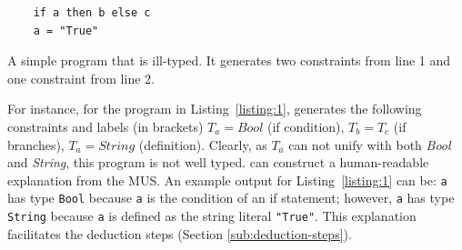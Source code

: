 \begin{listing}[!ht]
\begin{verbatim}
    if a then b else c
    a = "True"
\end{verbatim}
\vspace*{-9mm}
\caption{A simple program that is ill-typed. It generates two constraints from line 1 and one constraint from line 2. }
\label{listing:1}
\end{listing}
For instance, for the program in Listing~\ref{listing:1}, \chameleon{}  generates the following constraints and labels (in brackets) $T_a = Bool$ (if condition), $T_b = T_c$ (if branches), $T_a= String$  (definition). Clearly, as $T_a$ can not unify with both \textit{Bool} and \textit{String}, this program is not well typed. \chameleon{} can construct a human-readable explanation from the MUS. An example output for Listing~\ref{listing:1} can be: \texttt{a} has type \texttt{Bool} because \texttt{a} is the condition of an if statement; however, \texttt{a} has type \texttt{String} because \texttt{a} is defined as the string literal \texttt{"True"}. This explanation facilitates the deduction steps (Section \ref{sub:deduction-steps}). 






